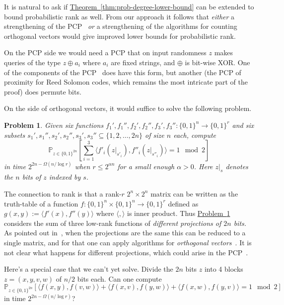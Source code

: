 \documentclass[11pt]{article}
\newcommand{\expref}[2]{\texorpdfstring{\hyperref[#2]{#1~\ref{#2}}}{#1~\ref{#2}}}
\newtheorem{problem}[theorem]{Problem}
\newcommand{\zo}{\{0, 1\}}
\renewcommand{\P}{\mathbb{P}}
\begin{document}
It is natural to ask if \expref{Theorem}{thm:prob-degree-lower-bound}
can be extended to bound probabilistic rank as well. From our approach
it follows that \emph{either} a strengthening of the PCP~\cite{Ben-SassonV-AC0PCP}
\emph{or }a strengthening of the algorithms for counting orthogonal
vectors \cite{DBLP:conf/soda/AbboudWY15,DBLP:conf/soda/ChanW16} would
give improved lower bounds for probabilistic rank.

On the PCP side we would need a PCP that on input randomness $z$
makes queries of the type $z\oplus a_{i}$ where $a_{i}$ are fixed
strings, and $\oplus$ is bit-wise XOR. One of the components of the
PCP~\cite{Ben-SassonV-AC0PCP} does have this form, but another (the
PCP of proximity for Reed Solomon codes, which remains the most intricate
part of the proof) does permute bits.

On the side of orthogonal vectors,
%
%
it would suffice to solve the following problem.
\begin{problem}
\label{prob:Given-six-functions}Given six functions $f_{1}',f_{1}'',f_{2}',f_{2}'',f_{3}',f_{3}'':\zo^{n}\to\zo^{r}$
and six subsets $s_{1}',s_{1}'',s_{2}',s_{2}'',s_{3}',s_{3}''\subseteq\{1,2,\ldots,2n\}$
of size $n$ each, compute
\[
\P_{z\in\zo^{2n}}\left[\sum_{i=1}^{3}\langle f'_{i}(z|_{s'_{i}}),f''_{i}(z|_{s''_{i}})\rangle=1\mod2\right]
\]
in time $2^{2n-\Omega(n/\log r)}$ when $r\le2^{\alpha n}$ for a
small enough $\alpha>0$. Here $z|_{s}$ denotes the $n$ bits of
$z$ indexed by $s$.
\end{problem}

The connection to rank is that a rank-$r$ $2^{n}\times2^{n}$ matrix
can be written as the truth-table of a function $f:\zo^{n}\times\zo^{n}\to\zo^{r}$
defined as $g(x,y):=\langle f'(x),f''(y)\rangle$ where $\langle,\rangle$
is inner product. Thus \expref{Problem}{prob:Given-six-functions} considers
the sum of three low-rank functions of \emph{different projections
of $2n$ bits. }As pointed out in~\cite{AlmanC19}, when the projections
are the same this can be reduced to a single matrix, and for that
one can apply algorithms for \emph{orthogonal vectors}~\cite{DBLP:conf/soda/ChanW16}.
It is not clear what happens for different projections, which could
arise in the PCP~\cite{Ben-SassonV-AC0PCP}.

Here's a special case that we can't yet solve. Divide the $2n$ bits
$z$ into 4 blocks $z=(x,y,v,w)$ of $n/2$ bits each. Can one compute
\[
\P_{z\in\zo^{2n}}[\langle f(x,y),f(v,w)\rangle+\langle f(x,v),f(y,w)\rangle+\langle f(x,w),f(y,v)\rangle=1\mod2]
\]
in time $2^{2n-\Omega(n/\log r)}$?
\end{document}
